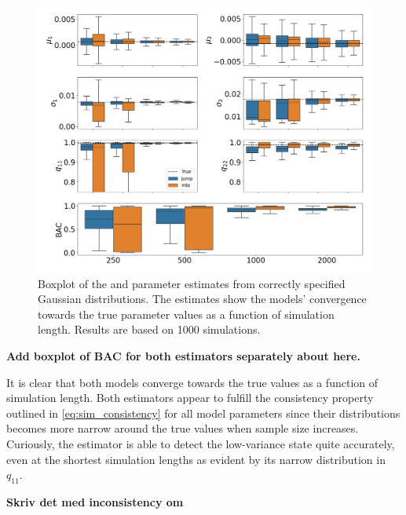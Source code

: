 \begin{figure}[H] 
    \centering
    \includegraphics[width=1\textwidth]{analysis/model_convergence/images/simulation_normal_box.png}
    \caption[Boxplot of \mle and \jump parameter estimates from correctly specified conditional Gaussian distributions]{Boxplot of the \mle and \jump parameter estimates from correctly specified Gaussian distributions. The estimates show the models' convergence towards the true parameter values as a function of simulation length. Results are based on 1000 simulations.}
    \label{fig:jump_normal_box}
\end{figure}

\textbf{Add boxplot of BAC for both estimators separately about here.}

It is clear that both models converge towards the true values as a function of simulation length. Both estimators appear to fulfill the consistency property outlined in \cref{eq:sim_consistency} for all model parameters since their distributions becomes more narrow around the true values when sample size increases. Curiously, the \jump estimator is able to detect the low-variance state quite accurately, even at the shortest simulation lengths as evident by its narrow distribution in $q_{11}$.

\textbf{Skriv det med inconsistency om}

